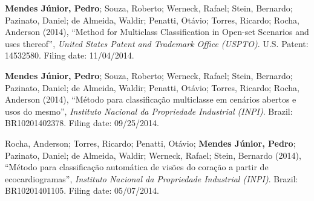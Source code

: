 \documentclass{article}
\begin{document}
\begin{enumerate}[label={[\arabic*]},resume]
\item\label{ref:MendesJunior2014a} \textbf{Mendes Júnior, Pedro}; Souza, Roberto; Werneck, Rafael; Stein, Bernardo; Pazinato, Daniel; de Almeida, Waldir; Penatti, Otávio; Torres, Ricardo; Rocha, Anderson (2014), ``Method for Multiclass Classification in Open-set Scenarios and uses thereof'', \emph{United States Patent and Trademark Office (USPTO)}. U.S. Patent: 14532580. Filing date:  11/04/2014.\\
\item\label{ref:MendesJunior2014} \textbf{Mendes Júnior, Pedro}; Souza, Roberto; Werneck, Rafael; Stein, Bernardo; Pazinato, Daniel; de Almeida, Waldir; Penatti, Otávio; Torres, Ricardo; Rocha, Anderson (2014), ``Método para classificação multiclasse em cenários abertos e usos do mesmo'', \emph{Instituto Nacional da Propriedade Industrial (INPI)}. Brazil: BR10201402378. Filing date: 09/25/2014.\\
\item\label{ref:Rocha2014} Rocha, Anderson; Torres, Ricardo; Penatti, Otávio; \textbf{Mendes Júnior, Pedro}; Pazinato, Daniel; de Almeida, Waldir; Werneck, Rafael; Stein, Bernardo (2014), ``Método para classificação automática de visões do coração a partir de ecocardiogramas'', \emph{Instituto Nacional da Propriedade Industrial (INPI)}. Brazil: BR10201401105. Filing date: 05/07/2014.
\end{enumerate}

% 
% 
\end{document}
